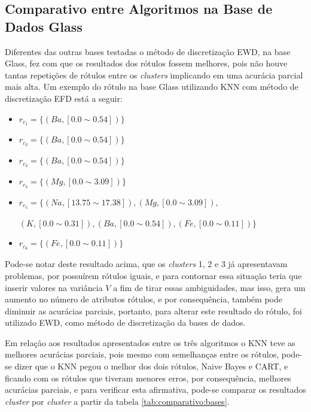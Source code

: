 \subsection{Comparativo entre Algoritmos na Base de Dados Glass} \label{cap:resultados:ssec:compalgoritmos:glass}

Diferentes das outras bases testadas o método de discretização EWD, na base Glass, fez com que os resultados dos rótulos fossem melhores, pois não houve tantas repetições de rótulos entre os \textit{clusters} implicando em uma acurácia parcial mais alta. Um exemplo do rótulo na base Glass utilizando KNN com método de discretização EFD está a seguir:
\begin{itemize}[noitemsep]
 \item ${r_{c_1}=\{ (Ba,[ 0.0 \sim 0.54 ] )\} }$
 \item ${r_{c_2}=\{(Ba,[ 0.0 \sim 0.54 ] ) \} }$
 \item ${r_{c_3}=\{ (Ba,[ 0.0 \sim 0.54 ])  \} }$  
 \item ${r_{c_4}=\{ (Mg,[ 0.0 \sim 3.09 ] ) \}}$
 \item ${r_{c_5}=\{ (Na,[13.75 \sim  17.38 ] ), (Mg,[ 0.0 \sim 3.09 ] ), }$
 
 ${(K,[ 0.0 \sim 0.31 ] ), (Ba,[ 0.0 \sim 0.54 ] ), (Fe,[ 0.0 \sim 0.11] ) \} }$
 \item ${r_{c_6}=\{ (Fe,[ 0.0 \sim 0.11] ) \} }$
\end{itemize}

Pode-se notar deste resultado acima, que os \textit{clusters} 1, 2 e 3 já apresentavam problemas, por possuírem rótulos iguais, e para contornar essa situação teria que inserir valores na variância ${V}$ a fim de tirar essas ambiguidades, mas isso, gera um aumento no número de atributos rótulos, e por consequência, também pode diminuir as  acurácias parciais, portanto, para alterar este resultado do rótulo, foi utilizado EWD, como método de discretização da bases de dados.
 
Em relação aos resultados apresentados entre os três algoritmos o KNN teve as melhores acurácias parciais, pois mesmo com semelhanças entre os rótulos, pode-se dizer que o KNN pegou o melhor dos dois rótulos, Naive Bayes e CART, e ficando com os rótulos que tiveram menores erros, por consequência, melhores acurácias parciais, e para verificar esta afirmativa, pode-se comparar os resultados \textit{cluster} por \textit{cluster} a partir da tabela \ref{tab:comparativo:bases}.

